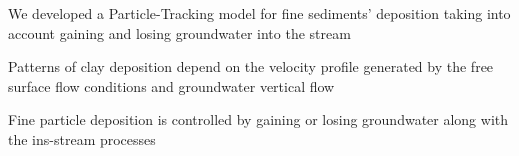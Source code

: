 \documentclass[draft,linenumbers]{agujournal2018}
\begin{document}







\begin{keypoints}
\item We developed a Particle-Tracking model for fine sediments' deposition taking into account gaining and losing groundwater into the stream
\item Patterns of clay deposition depend on the velocity profile generated by the free surface flow conditions and groundwater vertical flow
\item Fine particle deposition is controlled by gaining or losing groundwater along with the ins-stream processes
\end{keypoints}

\end{document}
